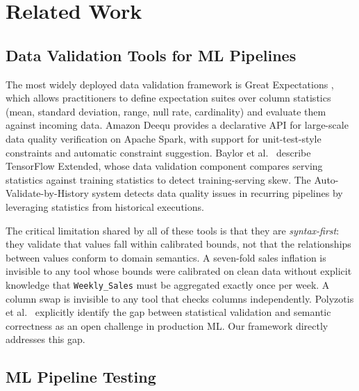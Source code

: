 \documentclass[journal]{IEEEtran}
\begin{document}
\section{Related Work}
\label{sec:related}

\subsection{Data Validation Tools for ML Pipelines}

The most widely deployed data validation framework is Great Expectations
\cite{greatexpectations2023}, which allows practitioners to define
expectation suites over column statistics (mean, standard deviation,
range, null rate, cardinality) and evaluate them against incoming data.
Amazon Deequ \cite{schelter2018deequ} provides a declarative API for
large-scale data quality verification on Apache Spark, with support for
unit-test-style constraints and automatic constraint suggestion.  Baylor
et al.\ \cite{baylor2017tfx} describe TensorFlow Extended, whose data
validation component compares serving statistics against training statistics
to detect training-serving skew.  The Auto-Validate-by-History system
\cite{schelter2018automating} detects data quality issues in recurring
pipelines by leveraging statistics from historical executions.

The critical limitation shared by all of these tools is that they are
\emph{syntax-first}: they validate that values fall within calibrated
bounds, not that the relationships between values conform to domain
semantics.  A seven-fold sales inflation is invisible to any tool whose
bounds were calibrated on clean data without explicit knowledge that
\texttt{Weekly\_Sales} must be aggregated exactly once per week.  A column
swap is invisible to any tool that checks columns independently.  Polyzotis
et al.\ \cite{polyzotis2018} explicitly identify the gap between statistical
validation and semantic correctness as an open challenge in production ML.
Our framework directly addresses this gap.

\subsection{ML Pipeline Testing}
\end{document}
